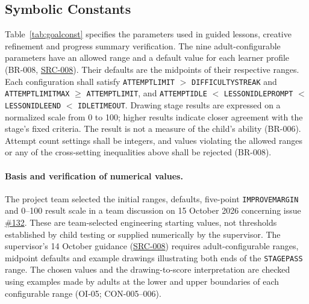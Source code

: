 \documentclass[12pt]{article}
\renewcommand{\_}{\textunderscore\allowbreak}%
\newcommand{\srcref}[1]{\hyperref[src:#1]{SRC-#1}}
\begin{document}
\subsection{Symbolic Constants}
\label{sec:constants}
Table~\ref{tab:goalconst} specifies the parameters used in guided lessons,
creative refinement and progress summary verification. The nine
adult-configurable parameters have an allowed range and a default value for each
learner profile (BR-008, \srcref{008}). Their defaults are the midpoints of
their respective ranges. Each configuration shall satisfy
\texttt{ATTEMPT\_LIMIT} $>$ \texttt{DIFFICULTY\_STREAK} and
\texttt{ATTEMPT\_LIMIT\_MAX} $\geq$ \texttt{ATTEMPT\_LIMIT}, and
\texttt{ATTEMPT\_IDLE} $<$ \texttt{LESSON\_IDLE\_PROMPT} $<$
\texttt{LESSON\_IDLE\_END} $<$ \texttt{IDLE\_TIMEOUT}. Drawing stage
results are expressed on a normalized scale from 0 to 100; higher results
indicate closer agreement with the stage's fixed criteria. The result is not a
measure of the child's ability (BR-006). Attempt count settings shall be
integers, and values violating the allowed ranges or any of the cross-setting
inequalities above shall be rejected (BR-008).

\paragraph{Basis and verification of numerical values.}
The project team selected the initial ranges, defaults, five-point
\texttt{IMPROVE\_MARGIN} and 0--100 result scale in a team discussion on 15
October 2026 concerning issue
\href{https://github.com/AHMEDELZARIA/squigglr/issues/132}{\#132}. These are
team-selected engineering starting values, not thresholds established by child
testing or supplied numerically by the supervisor. The supervisor's 14 October
guidance (\srcref{008}) requires adult-configurable ranges, midpoint defaults
and example drawings illustrating both ends of the \texttt{STAGE\_PASS} range.
The chosen values and the drawing-to-score interpretation are checked using
examples made by adults at the lower and upper boundaries of each configurable
range (OI-05; CON-005--006).
\end{document}
